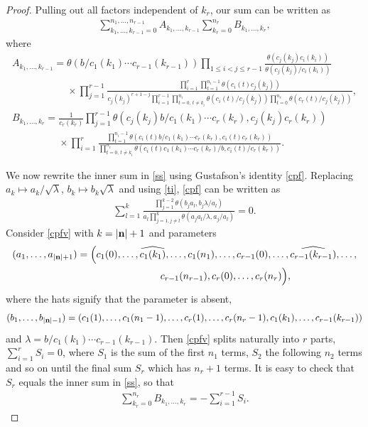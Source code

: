\begin{proof}
 Pulling out all factors independent of $k_r$, our
sum can be written as
\begin{gather}\label{ss}
\sum_{k_1,\dots,k_{r-1}=0}^{n_1,\dots,n_{r-1}}A_{k_1,\dots,k_{r-1}}
\sum_{k_r=0}^{n_r}B_{k_1,\dots,k_{r}},
\end{gather}
where
\begin{gather*}
A_{k_1,\dots,k_{r-1}}
=\theta(b/c_1(k_1)\dotsm c_{r-1}(k_{r-1}))\prod\limits_{1\leq i<j\leq
 r-1}\frac{\theta(c_j(k_j)c_i(k_i))}{\theta(c_j(k_j)/c_i(k_i))}
 \\ \phantom{A_{k_1,\dots,k_{r-1}}=}{}
\times\prod\limits_{j=1}^{r-1}\frac{\prod\limits_{i=1}^r\prod\limits_{t=1}^{n_i-1}
\theta(c_i(t)c_j(k_j))}
{c_j(k_j)^{r+1-j}\prod\limits_{i=1}^{r-1}\prod\limits_{t=0,\,t\neq
 k_i}^{n_i}\theta(c_i(t)/c_j(k_j))\prod\limits_{t=0}^{n_r}\theta(c_r(t)/c_j(k_j))},
\\
B_{k_1,\dots,k_{r}}=
\frac{1}{c_r(k_r)}\prod\limits_{j=1}^{r-1}
\theta(c_j(k_j)b/c_1(k_1)\dotsm c_r(k_r),c_j(k_j)c_r(k_r))
\\ \phantom{B_{k_1,\dots,k_{r}}=}{}
\times\prod\limits_{i=1}^r\frac{\prod\limits_{t=1}^{n_i-1}\theta(c_i(t)b/c_1(k_1)\dotsm
 c_r(k_r),c_i(t)c_r(k_r))}{\prod\limits_{t=0,\,t\neq
 k_i}^{n_i}\theta(c_i(t)c_1(k_1)\dotsm
 c_r(k_r)/b,c_i(t)/c_r(k_r))}.
 \end{gather*}

We now rewrite the inner sum in \eqref{ss} using
 Gustafson's identity \eqref{cpf}. Replacing $a_k\mapsto
a_k/\sqrt\lambda$, $b_k\mapsto b_k\sqrt\lambda$ and using \eqref{ti},
\eqref{cpf} can be written as
\begin{gather}\label{cpfv}
\sum_{l=1}^k\frac{\prod\limits_{j=1}^{k-2}\theta(b_ja_l,b_j\lambda/a_l)}
{a_l\prod\limits_{j=1, j\neq l}^k\theta(a_ja_l/\lambda,a_j/a_l)}=0.
\end{gather}
Consider \eqref{cpfv} with $k=|{\bf n}|+1$ and parameters
\begin{gather*}
(a_1,\dots,a_{|{\bf n}|+1})=
\Big(c_1(0),\dots,\widehat{c_1(k_1)},\dots,c_1(n_1),\dots, c_{r-1}(0),\dots,\widehat{c_{r-1}(k_{r-1})},
\dots,
\\ \phantom{(a_1,\dots,a_{|{\bf n}|+1})=(}
c_{r-1}(n_{r-1}), c_r(0),\dots,c_r(n_r)\Big),
\end{gather*}
where the hats signify that the parameter is absent,
\begin{gather*}
(b_1,\dots,b_{|{\bf n}|-1})=
(c_1(1),\dots,c_1(n_1-1),\dots, c_r(1),\dots,c_r(n_r-1),
c_1(k_1),\dots,c_{r-1}(k_{r-1}))
\end{gather*}
and $\lambda=b/c_1(k_1)\dotsm c_{r-1}(k_{r-1})$. Then \eqref{cpfv}
splits naturally into $r$ parts, $\sum_{i=1}^rS_i=0$, where $S_1$ is
the sum of the first $n_1$ terms, $S_2$ the following $n_2$ terms and
so on until the final sum $S_r$ which has $n_r+1$ terms. It is
easy to check that $S_r$ equals the inner sum in \eqref{ss}, so that
\begin{gather*}
\sum_{k_r=0}^{n_r}B_{k_1,\dots,k_{r}}=-\sum_{i=1}^{r-1}S_i.
\end{gather*}


\end{proof}
